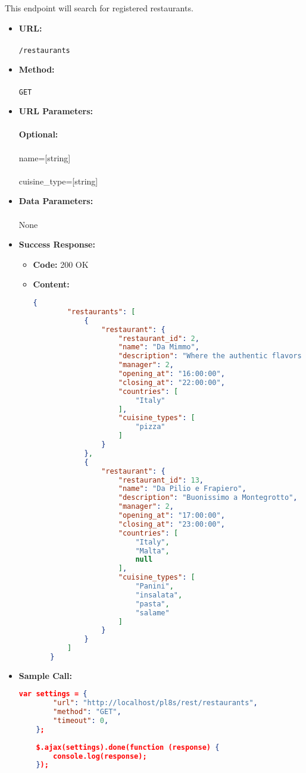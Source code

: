 

This endpoint will search for registered restaurants.

\begin{itemize}
    \item \textbf{URL:} \\\\\texttt{/restaurants}
    \item \textbf{Method:} \\\\\texttt{GET}
    \item \textbf{URL Parameters:}\\\\
    \textbf{Optional:}\\\\
	name=[string]\\\\
	cuisine\_type=[string]
    \item \textbf{Data Parameters:} \\\\None
    \item \textbf{Success Response:}
		\begin{itemize}
			\item[$\circ$] \textbf{Code:} 200 OK
			\item[] \textbf{Content:}
			\begin{lstlisting}[language=json]
	{
		"restaurants": [
			{
				"restaurant": {
					"restaurant_id": 2,
					"name": "Da Mimmo",
					"description": "Where the authentic flavors of Napoli come to life in every slice.",
					"manager": 2,
					"opening_at": "16:00:00",
					"closing_at": "22:00:00",
					"countries": [
						"Italy"
					],
					"cuisine_types": [
						"pizza"
					]
				}
			},
			{
				"restaurant": {
					"restaurant_id": 13,
					"name": "Da Pilio e Frapiero",
					"description": "Buonissimo a Montegrotto",
					"manager": 2,
					"opening_at": "17:00:00",
					"closing_at": "23:00:00",
					"countries": [
						"Italy",
						"Malta",
						null
					],
					"cuisine_types": [
						"Panini",
						"insalata",
						"pasta",
						"salame"
					]
				}
			}
		]
	}
			\end{lstlisting}
		\end{itemize}
	
    \item \textbf{Sample Call:}
		\medskip
		\begin{lstlisting}[language=json]
	var settings = {
		"url": "http://localhost/pl8s/rest/restaurants",
		"method": "GET",
		"timeout": 0,
	};
	
	$.ajax(settings).done(function (response) {
		console.log(response);
	});
		\end{lstlisting}
    
\end{itemize}
